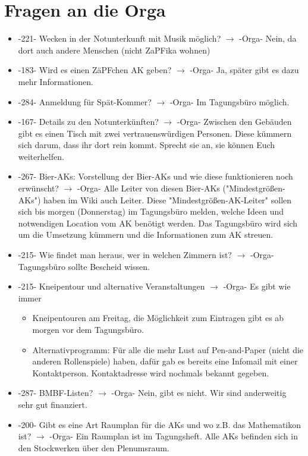 \section{Fragen an die Orga}
  \begin{itemize}
    \item -221- Wecken in der Notunterkunft mit Musik möglich? $\rightarrow$ -Orga- Nein, da dort auch andere Menschen (nicht ZaPFika wohnen)
    \item -183- Wird es einen ZäPFchen AK geben? $\rightarrow$ -Orga- Ja, später gibt es dazu mehr Informationen.
    \item -284- Anmeldung für Spät-Kommer? $\rightarrow$ -Orga- Im Tagungsbüro möglich.
    \item -167- Details zu den Notunterkünften? $\rightarrow$ -Orga- Zwischen den Gebäuden gibt es einen Tisch mit zwei vertrauenswürdigen Personen. Diese kümmern sich darum, dass ihr dort rein kommt. Sprecht sie an, sie können Euch weiterhelfen.
    \item -267- Bier-AKs: Vorstellung der Bier-AKs und wie diese funktionieren noch erwünscht? $\rightarrow$ -Orga- Alle Leiter von diesen Bier-AKs ("Mindestgrößen-AKs") haben im Wiki auch Leiter. Diese "Mindestgrößen-AK-Leiter" sollen sich bis morgen (Donnerstag) im Tagungsbüro melden, welche Ideen und notwendigen Location vom AK benötigt werden. Das Tagungsbüro wird sich um die Umsetzung kümmern und die Informationen zum AK streuen.
    \item -215- Wie findet man heraus, wer in welchen Zimmern ist? $\rightarrow$ -Orga- Tagungsbüro sollte Bescheid wissen.
    \item -215- Kneipentour und alternative Veranstaltungen $\rightarrow$ -Orga- Es gibt wie immer
      \begin{itemize}
        \item Kneipentouren am Freitag, die Möglichkeit zum Eintragen gibt es ab morgen vor dem Tagungsbüro.
        \item Alternativprogramm: Für alle die mehr Lust auf Pen-and-Paper (nicht die anderen Rollenspiele) haben, dafür gab es bereits eine Infomail mit einer Kontaktperson. Kontaktadresse wird nochmals bekannt gegeben.
      \end{itemize}
    \item -287- BMBF-Listen? $\rightarrow$ -Orga- Nein, gibt es nicht. Wir sind anderweitig sehr gut finanziert.
    \item -200- Gibt es eine Art Raumplan für die AKs und wo z.B. das Mathematikon ist? $\rightarrow$ -Orga- Ein Raumplan ist im Tagungsheft. Alle AKs befinden sich in den Stockwerken über den Plenumsraum.

\end{itemize}
